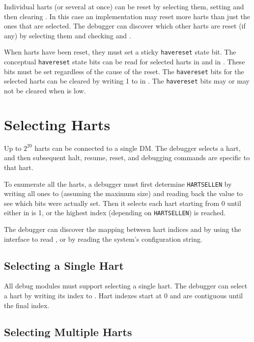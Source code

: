 Individual harts (or several at once) can be reset by selecting them, setting
and then clearing \Fhartreset. In this case an implementation may reset more
harts than just the ones that are selected. The debugger can discover which
other harts are reset (if any) by selecting them and checking \Fanyhavereset
and \Fallhavereset.

When harts have been reset, they must set a sticky {\tt havereset} state bit.
The conceptual {\tt havereset} state bits can be read for selected harts in
\Fanyhavereset and \Fallhavereset in \Rdmstatus.
These bits must be set regardless of the cause of the reset.
The {\tt havereset} bits for the selected harts
can be cleared by writing 1 to \Fackhavereset in \Rdmcontrol.
The {\tt havereset} bits may or may not be cleared
when \Fdmactive is low.

\section{Selecting Harts} \label{selectingharts}

Up to $2^{20}$ harts can be connected to a single DM. The debugger
selects a hart, and then subsequent halt, resume, reset, and debugging
commands are specific to that hart.

To enumerate all the harts, a debugger must first determine {\tt HARTSELLEN}
by writing  all ones to \Fhartsel (assuming the maximum size) and reading back
the value to see which bits were actually set.  Then it selects each hart
starting from 0 until either \Fanynonexistent in \Rdmstatus is 1, or the
highest index (depending on {\tt HARTSELLEN}) is reached.

The debugger can discover the mapping between hart indices and
\Rmhartid by using the interface to read \Rmhartid, or by
reading the system's configuration string.

\subsection {Selecting a Single Hart}

All debug modules must support selecting a single hart.
The debugger can select a hart by writing its index to \Fhartsel.
Hart indexes start at 0 and are contiguous until the final index.

\subsection {Selecting Multiple Harts} \label{hartarraymask}

